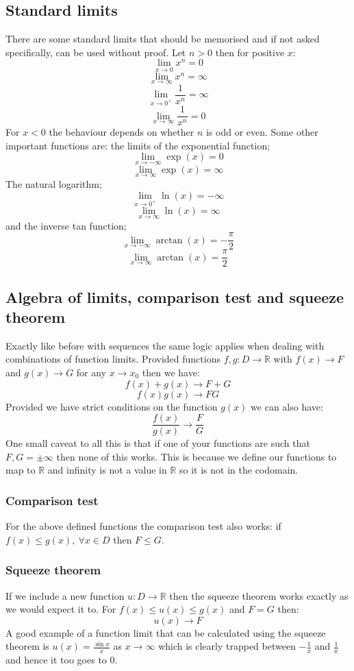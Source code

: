 \documentclass[12pt]{article}
\begin{document}
\subsection*{Standard limits}
There are some standard limits that should be memorised and if not asked specifically, can be used without proof. Let \(n>0\) then for positive \(x\):
\[\lim_{x\to0}x^n=0\]
\[\lim_{x\to\infty}x^n=\infty\]
\[\lim_{x\to0^+}\frac{1}{x^n}=\infty\]
\[\lim_{x\to\infty}\frac{1}{x^n}=0\]
For \(x<0\) the behaviour depends on whether \(n\) is odd or even. Some other important functions are: the limits of the exponential function;
\[\lim_{x\to-\infty}\exp{(x)}=0\]
\[\lim_{x\to\infty}\exp{(x)}=\infty\]
The natural logarithm;
\[\lim_{x\to0^+}\ln{(x)}=-\infty\]
\[\lim_{x\to\infty}\ln{(x)}=\infty\]
and the inverse tan function;
\[\lim_{x\to-\infty}\arctan{(x)}=-\frac{\pi}{2}\]
\[\lim_{x\to\infty}\arctan{(x)}=\frac{\pi}{2}\]
\subsection*{Algebra of limits, comparison test and squeeze theorem}
Exactly like before with sequences the same logic applies when dealing with combinations of function limits. Provided functions \(f,g:D\to\mathbb{R}\) with \(f(x)\to F\) and \(g(x)\to G\) for any \(x\to x_0\) then we have:
\[f(x)+g(x)\to F+G\]
\[f(x)g(x)\to FG\]
Provided we have strict conditions on the function \(g(x)\) we can also have:
\[\frac{f(x)}{g(x)}\to \frac{F}{G}\]
One small caveat to all this is that if one of your functions are such that \(F,G=\pm\infty\) then none of this works. This is because we define our functions to map to \(\mathbb{R}\) and infinity is not a value in \(\mathbb{R}\) so it is not in the codomain.
\subsubsection*{Comparison test}
For the above defined functions the comparison test also works: if \(f(x)\leq g(x),\ \forall x\in D\) then \(F\leq G\).
\subsubsection*{Squeeze theorem}
If we include a new function \(u:D\to\mathbb{R}\) then the squeeze theorem works exactly as we would expect it to. For \(f(x)\leq u(x)\leq g(x)\) and \(F=G\) then:
\[u(x)\to F\]
A good example of a function limit that can be calculated using the squeeze theorem is \(u(x)=\frac{\sin{x}}{x}\) as \(x\to\infty\) which is clearly trapped between \(-\frac{1}{x}\) and \(\frac{1}{x}\) and hence it too goes to \(0\).
\end{document}
